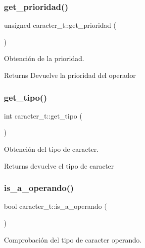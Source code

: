 \subsubsection{\texorpdfstring{get\+\_\+prioridad()}{get\_prioridad()}}
{\footnotesize\ttfamily unsigned caracter\+\_\+t\+::get\+\_\+prioridad (\begin{DoxyParamCaption}{ }\end{DoxyParamCaption})}



Obtención de la prioridad. 

\begin{DoxyReturn}{Returns}
Devuelve la prioridad del operador 
\end{DoxyReturn}
\mbox{\label{classcaracter__t_a6988fe91ec8173773a19f85303b00ec1}} 
\subsubsection{\texorpdfstring{get\+\_\+tipo()}{get\_tipo()}}
{\footnotesize\ttfamily int caracter\+\_\+t\+::get\+\_\+tipo (\begin{DoxyParamCaption}{ }\end{DoxyParamCaption})}



Obtención del tipo de caracter. 

\begin{DoxyReturn}{Returns}
devuelve el tipo de caracter 
\end{DoxyReturn}
\mbox{\label{classcaracter__t_a1afa6c012abdce3daf85f555ea8c8d7c}} 
\subsubsection{\texorpdfstring{is\+\_\+a\+\_\+operando()}{is\_a\_operando()}}
{\footnotesize\ttfamily bool caracter\+\_\+t\+::is\+\_\+a\+\_\+operando (\begin{DoxyParamCaption}{ }\end{DoxyParamCaption})}



Comprobación del tipo de caracter operando. 

